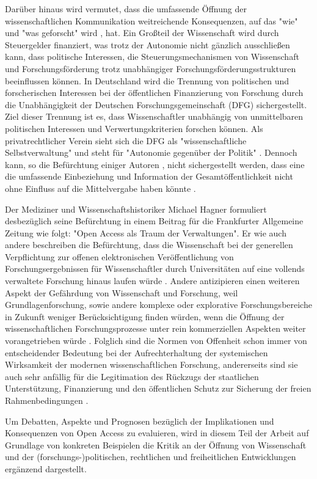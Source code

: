 Darüber hinaus wird vermutet, dass die umfassende Öffnung der wissenschaftlichen Kommunikation weitreichende Konsequenzen, auf das "wie" und "was geforscht" wird \cite{suchen}, hat. Ein Großteil der Wissenschaft wird durch Steuergelder finanziert, was trotz der Autonomie nicht gänzlich ausschließen kann, dass politische Interessen, die Steuerungsmechanismen von Wissenschaft und Forschungsförderung trotz unabhängiger Forschungsförderungsstrukturen beeinflussen können. In Deutschland wird die Trennung von politischen und forscherischen Interessen bei der öffentlichen Finanzierung von Forschung durch die Unabhängigkeit der Deutschen Forschungsgemeinschaft (DFG) sichergestellt. Ziel dieser Trennung ist es, dass Wissenschaftler unabhängig von unmittelbaren politischen Interessen und Verwertungskriterien forschen können. Als privatrechtlicher Verein sieht sich die DFG als "wissenschaftliche Selbstverwaltung" und steht für "Autonomie gegenüber der Politik" \cite{DFG_2011}. Dennoch kann, so die Befürchtung einiger Autoren \cite{suchen}, nicht sichergestellt werden, dass eine die umfassende Einbeziehung und Information der Gesamtöffentlichkeit nicht ohne Einfluss auf die Mittelvergabe haben könnte \cite{weingart_2005_wissenschaft}.

Der Mediziner und Wissenschaftshistoriker Michael Hagner formuliert desbezüglich seine Befürchtung in einem Beitrag für die Frankfurter Allgemeine Zeitung wie folgt: "Open Access als Traum der Verwaltungen". Er wie auch andere beschreiben die Befürchtung, dass die Wissenschaft bei der generellen Verpflichtung zur offenen elektronischen Veröffentlichung von Forschungsergebnissen für Wissenschaftler durch Universitäten auf eine vollends verwaltete Forschung hinaus laufen würde \cite{hagner_faz_2009}. Andere antizipieren einen weiteren Aspekt der Gefährdung von Wissenschaft und Forschung, weil Grundlagenforschung, sowie andere komplexe oder explorative Forschungsbereiche in Zukunft weniger Berücksichtigung finden würden, wenn die Öffnung der wissenschaftlichen Forschungsprozesse unter rein kommerziellen Aspekten weiter vorangetrieben würde \cite{suchen}.
Folglich sind die Normen von Offenheit schon immer von entscheidender Bedeutung bei der Aufrechterhaltung der systemischen Wirksamkeit der modernen wissenschaftlichen Forschung, andererseits sind sie auch sehr anfällig für die Legitimation des Rückzugs der staatlichen Unterstützung, Finanzierung und den öffentlichen Schutz zur Sicherung der freien Rahmenbedingungen \cite{david1998_common}.

Um Debatten, Aspekte und Prognosen bezüglich der Implikationen und Konsequenzen von Open Access zu evaluieren, wird in diesem Teil der Arbeit auf Grundlage von konkreten Beispielen die Kritik an der Öffnung von Wissenschaft und der (forschungs-)politischen, rechtlichen und freiheitlichen Entwicklungen ergänzend dargestellt.

